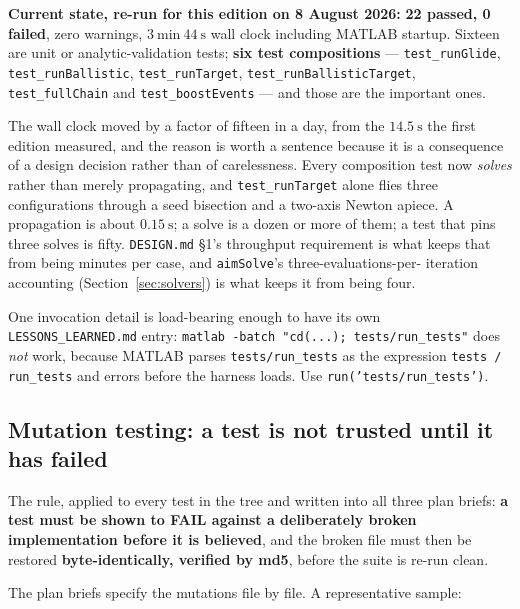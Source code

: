 \documentclass[11pt]{article}
\newcommand{\code}[1]{\texttt{#1}}
\begin{document}
\textbf{Current state, re-run for this edition on 8 August 2026:}
\textbf{22 passed, 0 failed}, zero warnings, $3~\mathrm{min}~44~\mathrm{s}$
wall clock including MATLAB startup. Sixteen are unit or analytic-validation
tests; \textbf{six test compositions} --- \code{test\_runGlide},
\code{test\_runBallistic}, \code{test\_runTarget},
\code{test\_runBallisticTarget}, \code{test\_fullChain} and
\code{test\_boostEvents} --- and those are the important ones.

The wall clock moved by a factor of fifteen in a day, from the
$14.5~\mathrm{s}$ the first edition measured, and the reason is worth a
sentence because it is a consequence of a design decision rather than of
carelessness. Every composition test now \emph{solves} rather than merely
propagating, and \code{test\_runTarget} alone flies three configurations
through a seed bisection and a two-axis Newton apiece. A propagation is about
$0.15~\mathrm{s}$; a solve is a dozen or more of them; a test that pins three
solves is fifty. \code{DESIGN.md} \S1's throughput requirement is what keeps
that from being minutes per case, and \code{aimSolve}'s three-evaluations-per-
iteration accounting (Section~\ref{sec:solvers}) is what keeps it from being
four.

One invocation detail is load-bearing enough to have its own
\code{LESSONS\_LEARNED.md} entry: \code{matlab -batch "cd(...); tests/run\_tests"}
does \emph{not} work, because MATLAB parses \code{tests/run\_tests} as the
expression \code{tests / run\_tests} and errors before the harness loads. Use
\code{run('tests/run\_tests')}.

\subsection{Mutation testing: a test is not trusted until it has failed}

The rule, applied to every test in the tree and written into all three plan
briefs: \textbf{a test must be shown to FAIL against a deliberately broken
implementation before it is believed}, and the broken file must then be
restored \textbf{byte-identically, verified by md5}, before the suite is re-run
clean.

The plan briefs specify the mutations file by file. A representative sample:
\end{document}
